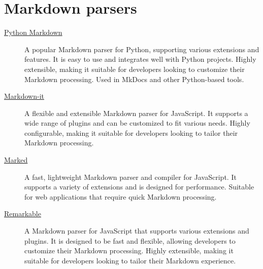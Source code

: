 \documentclass[a4paper,twoside]{article}
\begin{document}
\section{Markdown parsers}
\begin{description}
\item[{\href{https://python-markdown.github.io/}{Python Markdown}}] A popular Markdown parser for Python, supporting various extensions and features. It is easy to use and integrates well with Python projects. Highly extensible, making it suitable for developers looking to customize their Markdown processing. Used in MkDocs and other Python-based tools.
\item[{\href{https://markdown-it.github.io/}{Markdown-it}}] A flexible and extensible Markdown parser for JavaScript. It supports a wide range of plugins and can be customized to fit various needs. Highly configurable, making it suitable for developers looking to tailor their Markdown processing.
\item[{\href{https://marked.js.org/}{Marked}}] A fast, lightweight Markdown parser and compiler for JavaScript. It supports a variety of extensions and is designed for performance. Suitable for web applications that require quick Markdown processing.
\item[{\href{https://github.com/jonschlinkert/remarkable}{Remarkable}}] A Markdown parser for JavaScript that supports various extensions and plugins. It is designed to be fast and flexible, allowing developers to customize their Markdown processing. Highly extensible, making it suitable for developers looking to tailor their Markdown experience.
\end{description}
\end{document}
